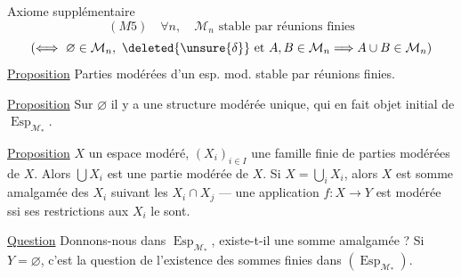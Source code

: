 Axiome supplémentaire
\[
 (M5)\quad \forall n,\quad \mathcal M_n\text{ stable par réunions finies}
\]
\[
 (\Longleftrightarrow\ \varnothing\in\mathcal M_n,\ \deleted{\unsure{\delta}}\text{ et }A,B\in\mathcal M_n\Longrightarrow A\cup B\in\mathcal M_n)
\]
\uline{Proposition} Parties modérées d'un esp. mod. stable par réunions finies.

\uline{Proposition} Sur $\varnothing$ il y a une structure modérée unique, qui en fait objet initial de $\operatorname{Esp}_{\mathcal M_*}$.

\uline{Proposition}  $X$ un espace modéré, $(X_i)_{i\in I}$ une famille finie de parties modérées de $X$. Alors $\bigcup X_i$ est une partie modérée de $X$. Si $X=\bigcup_iX_i$, alors $X$ est somme amalgamée des $X_i$ suivant les $X_i\cap X_j$ --- une application $f:X\longrightarrow Y$  est modérée ssi ses restrictions aux $X_i$ le sont.

\uline{Question} Donnons-nous
dans $\operatorname{Esp}_{\mathcal M_*}$, existe-t-il une somme amalgamée ? Si $Y=\varnothing$, c'est la question de l'existence des sommes finies dans $(\operatorname{Esp}_{\mathcal M_*})$.
